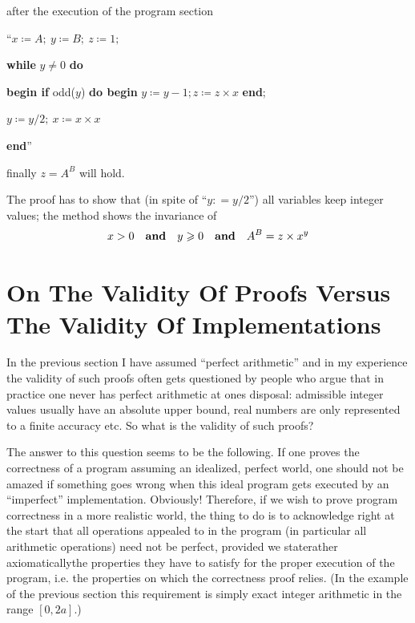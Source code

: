 \begin{enumerate}[wide, nosep, label=\textit{Remark }\arabic*.]
	\noindent
	after the execution of the program section
	
	{
		\setlength{\parindent}{8em}
		\hspace{-.4em}``$x \coloneq A;\ y \coloneq B;\ z \coloneq 1;$
		
		\textbf{while} $y \neq 0$ \textbf{do}
		
		\quad\textbf{begin if} odd($y$) \textbf{do begin} $y \coloneq y - 1; z \coloneq z \times x$ \textbf{end};
		
		\quad\quad $y \coloneq y/2;\ x \coloneq x \times x$
		
		\quad\textbf{end}''
	}
	
	\noindent
	finally $z = A^B$ will hold.
\end{enumerate}

The proof has to show that (in spite of ``$y: = y/2$'') all variables keep integer values; the method shows the invariance of
$$
x > 0\quad \text{\textbf{and}}\quad y \geqslant 0\quad \text{\textbf{and}}\quad A^B = z \times x^y
$$

\section[On the validity of proofs versus the validity of implementations]{On The Validity Of Proofs Versus The Validity Of Implementations}

In the previous section I have assumed ``perfect arithmetic'' and in my experience the validity of such proofs often gets questioned by people who argue that in practice one never has perfect arithmetic at ones disposal: admissible integer values usually have an absolute upper bound, real numbers are only represented to a finite accuracy etc. So what is the validity of such proofs?

The answer to this question seems to be the following. If one proves the correctness of a program assuming an idealized, perfect world, one should not be amazed if something goes wrong when this ideal program gets executed by an ``imperfect'' implementation. Obviously! Therefore, if we wish to prove program correctness in a more realistic world, the thing to do is to acknowledge right at the start that all operations appealed to in the program (in particular all arithmetic operations) need not be perfect, provided we state\textemdash{}rather axiomatically\textemdash{}the properties they have to satisfy for the proper execution of the program, i.e. the properties on which the correctness proof relies. (In the example of the previous section this requirement is simply exact integer arithmetic in the range $[0, 2a]$.)

